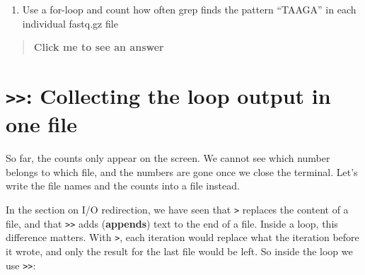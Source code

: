 \documentclass[
  letterpaper,
  DIV=11,
  numbers=noendperiod]{scrreprt}
\newenvironment{Shaded}{}{}
\newcommand{\AttributeTok}[1]{\textcolor[rgb]{0.84,0.23,0.29}{#1}}
\newcommand{\ControlFlowTok}[1]{\textcolor[rgb]{0.84,0.23,0.29}{#1}}
\newcommand{\FunctionTok}[1]{\textcolor[rgb]{0.44,0.26,0.76}{#1}}
\newcommand{\KeywordTok}[1]{\textcolor[rgb]{0.84,0.23,0.29}{#1}}
\newcommand{\NormalTok}[1]{\textcolor[rgb]{0.14,0.16,0.18}{#1}}
\newcommand{\PreprocessorTok}[1]{\textcolor[rgb]{0.84,0.23,0.29}{#1}}
\newcommand{\StringTok}[1]{\textcolor[rgb]{0.01,0.18,0.38}{#1}}
\newcommand{\VariableTok}[1]{\textcolor[rgb]{0.89,0.38,0.04}{#1}}
\providecommand{\tightlist}{%
  \setlength{\itemsep}{0pt}\setlength{\parskip}{0pt}}
\begin{document}
\begin{tcolorbox}[enhanced jigsaw, coltitle=black, breakable, titlerule=0mm, colback=white, rightrule=.15mm, bottomrule=.15mm, toprule=.15mm, colframe=quarto-callout-color-frame, colbacktitle=quarto-callout-color!10!white, bottomtitle=1mm, opacitybacktitle=0.6, toptitle=1mm, leftrule=.75mm, arc=.35mm, title=\textcolor{quarto-callout-color}{\faInfo}\hspace{0.5em}{Exercise}, left=2mm, opacityback=0]

\begin{enumerate}
\def\labelenumi{\arabic{enumi}.}
\tightlist
\item
  Use a for-loop and count how often grep finds the pattern ``TAAGA'' in
  each individual fastq.gz file
\end{enumerate}

\begin{quote}
\textbf{Click me to see an answer}

\begin{Shaded}
\end{Shaded}
\end{quote}

\end{tcolorbox}

\section{\texorpdfstring{\texttt{\textgreater{}\textgreater{}}:
Collecting the loop output in one
file}{\textgreater\textgreater: Collecting the loop output in one file}}\label{collecting-the-loop-output-in-one-file}

So far, the counts only appear on the screen. We cannot see which number
belongs to which file, and the numbers are gone once we close the
terminal. Let's write the file names and the counts into a file instead.

In the section on I/O redirection, we have seen that
\texttt{\textgreater{}} replaces the content of a file, and that
\texttt{\textgreater{}\textgreater{}} adds (\textbf{appends}) text to
the end of a file. Inside a loop, this difference matters. With
\texttt{\textgreater{}}, each iteration would replace what the iteration
before it wrote, and only the result for the last file would be left. So
inside the loop we use \texttt{\textgreater{}\textgreater{}}:
\end{document}
